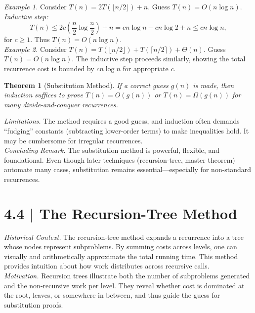 \documentclass[12pt]{article}
\newcommand{\microhead}[1]{\vspace{0.45em}\noindent\textit{#1}}
\newtheorem{theorem}{Theorem}
\theoremstyle{definition}
\begin{document}
\microhead{Example 1.} Consider $T(n) = 2T(\lfloor n/2 \rfloor) + n$. Guess $T(n) = O(n \log n)$.  
\textit{Inductive step:}
\[
T(n) \le 2c\left(\frac{n}{2}\log\frac{n}{2}\right) + n = cn\log n - cn\log 2 + n \le cn\log n,
\]
for $c \ge 1$. Thus $T(n) = O(n \log n)$. \\

\microhead{Example 2.} Consider $T(n) = T(\lfloor n/2 \rfloor) + T(\lceil n/2 \rceil) + \Theta(n)$. Guess $T(n) = O(n \log n)$. The inductive step proceeds similarly, showing the total recurrence cost is bounded by $cn\log n$ for appropriate $c$. \\

\begin{theorem}[Substitution Method]
If a correct guess $g(n)$ is made, then induction suffices to prove $T(n) = O(g(n))$ or $T(n) = \Omega(g(n))$ for many divide-and-conquer recurrences.
\end{theorem}

\microhead{Limitations.} The method requires a good guess, and induction often demands “fudging” constants (subtracting lower-order terms) to make inequalities hold. It may be cumbersome for irregular recurrences. \\

\microhead{Concluding Remark.} The substitution method is powerful, flexible, and foundational. Even though later techniques (recursion-tree, master theorem) automate many cases, substitution remains essential—especially for non-standard recurrences. \\

\newpage

\dotfill
\section*{4.4 | The Recursion-Tree Method}
\dotfill

\microhead{Historical Context.} The recursion-tree method expands a recurrence into a tree whose nodes represent subproblems. By summing costs across levels, one can visually and arithmetically approximate the total running time. This method provides intuition about how work distributes across recursive calls. \\

\microhead{Motivation.} Recursion trees illustrate both the number of subproblems generated and the non-recursive work per level. They reveal whether cost is dominated at the root, leaves, or somewhere in between, and thus guide the guess for substitution proofs. \\
\end{document}
